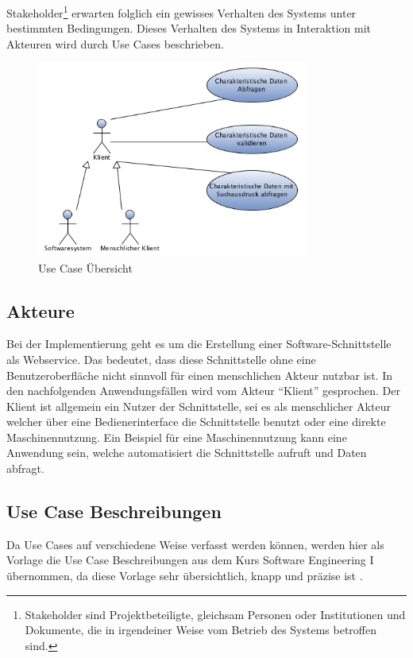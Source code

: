\gls{Stakeholder}\footnote{Stakeholder sind Projektbeteiligte, gleichsam Personen oder Institutionen und Dokumente, die in irgendeiner Weise vom Betrieb des Systems betroffen sind.} erwarten folglich ein gewisses Verhalten des Systems unter bestimmten Bedingungen. Dieses Verhalten des Systems in Interaktion mit Akteuren wird durch \glspl{Use Case} beschrieben.

\begin{figure}[htbp]
	\centering
		\includegraphics[width=0.80\textwidth]{images/usecases_plib.jpg}
	\caption{Use Case Übersicht}
	\label{fig:use_case_uebersicht}
\end{figure}

\subsection{Akteure}
Bei der Implementierung geht es um die Erstellung einer Software-Schnittstelle als \gls{Webservice}. Das bedeutet, dass diese Schnittstelle ohne eine Benutzeroberfläche nicht sinnvoll für einen menschlichen Akteur nutzbar ist. In den nachfolgenden Anwendungsfällen wird vom Akteur \enquote{Klient} gesprochen. Der Klient ist allgemein ein Nutzer der Schnittstelle, sei es als menschlicher Akteur welcher über eine Bedienerinterface die Schnittstelle benutzt oder eine direkte Maschinennutzung. Ein Beispiel für eine Maschinennutzung kann eine Anwendung sein, welche automatisiert die Schnittstelle aufruft und Daten abfragt.    

\subsection{Use Case Beschreibungen}

Da \glspl{Use Case} auf verschiedene Weise verfasst werden können, werden hier als Vorlage die \gls{Use Case} Beschreibungen aus dem Kurs Software Engineering I übernommen, da diese Vorlage sehr übersichtlich, knapp und präzise ist \citep[Vgl.][S. 120ff]{sixse1}. 

